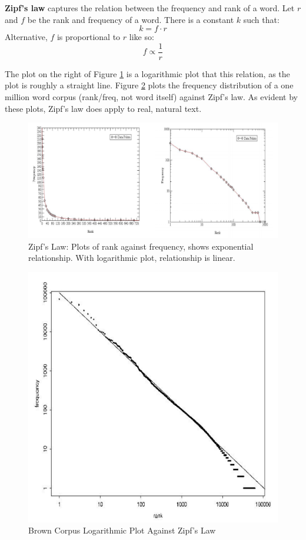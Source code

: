 \documentclass{article}
\begin{document}
\textbf{Zipf's law} captures the relation between the frequency and rank of a word. Let $r$ and $f$ be the rank and frequency of a word. There is a constant $k$ such that:
\begin{equation}
	k = f \cdot r
\end{equation}
Alternative, $f$ is proportional to $r$ like so:
\begin{equation}
	f \propto \frac{1}{r}
\end{equation}

The plot on the right of Figure \ref{fig:zipf} is a logarithmic plot that this relation, as the plot is roughly a straight line. Figure \ref{fig:zipf-corpus} plots the frequency distribution of a one million word corpus (rank/freq, not word itself) against Zipf's law. As evident by these plots, Zipf's law does apply to real, natural text.

\begin{figure}
	\centering
	\includegraphics[scale=0.4]{figures/zipfs-law.png}
	\caption{Zipf's Law: Plots of rank against frequency, shows exponential relationship. With logarithmic plot, relationship is linear.}
	\label{fig:zipf}
\end{figure}

\begin{figure}
	\centering
	\includegraphics[scale=0.4]{figures/brown-zipfs-law.png}
	\caption{Brown Corpus Logarithmic Plot Against Zipf's Law}
	\label{fig:zipf-corpus}
\end{figure}
\end{document}
